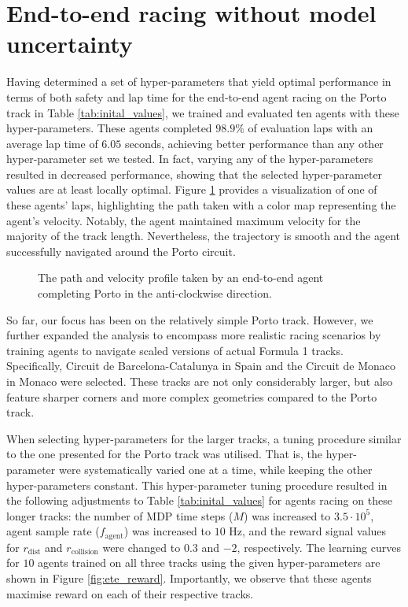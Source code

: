 
\section{End-to-end racing without model uncertainty}

Having determined a set of hyper-parameters that yield optimal performance in terms of both safety and lap time for the end-to-end agent racing on the Porto track in Table \ref{tab:inital_values}, we trained and evaluated ten agents with these hyper-parameters.
These agents completed $98.9\%$ of evaluation laps with an average lap time of $6.05$ seconds, achieving better performance than any other hyper-parameter set we tested.
In fact, varying any of the hyper-parameters resulted in decreased performance, showing that the selected hyper-parameter values are at least locally optimal.
Figure \ref{fig:ete_porto} provides a visualization of one of these agents' laps, highlighting the path taken with a color map representing the agent's velocity. 
Notably, the agent maintained maximum velocity for the majority of the track length.
Nevertheless, the trajectory is smooth and the agent successfully navigated around the Porto circuit.

\begin{figure}[htb!]
    \centering
    
    \caption[The path and velocity profile taken by an end-to-end agent completing Porto]{The path and velocity profile taken by an end-to-end agent completing Porto in the anti-clockwise direction.}
    \label{fig:ete_porto}
\end{figure}


So far, our focus has been on the relatively simple Porto track. 
However, we further expanded the analysis to encompass more realistic racing scenarios by training agents to navigate scaled versions of actual Formula 1 tracks. 
Specifically, Circuit de Barcelona-Catalunya in Spain and the Circuit de Monaco in Monaco were selected. 
These tracks are not only considerably larger, but also feature sharper corners and more complex geometries compared to the Porto track.


When selecting hyper-parameters for the larger tracks, a tuning procedure similar to the one presented for the Porto track was utilised. 
That is, the hyper-parameter were systematically varied one at a time, while keeping the other hyper-parameters constant. 
This hyper-parameter tuning procedure resulted in the following adjustments to Table \ref{tab:inital_values} for agents racing on these longer tracks: the number of MDP time steps ($M$) was increased to $3.5\cdot10^{5}$, agent sample rate ($f_{\text{agent}}$) was increased to $10$ Hz, and the reward signal values for $r_{\text{dist}}$ and  $r_{\text{collision}}$ were changed to $0.3$ and $-2$, respectively.
The learning curves for $10$ agents trained on all three tracks using the given hyper-parameters are shown in Figure \ref{fig:ete_reward}.
Importantly, we observe that these agents maximise reward on each of their respective tracks.


